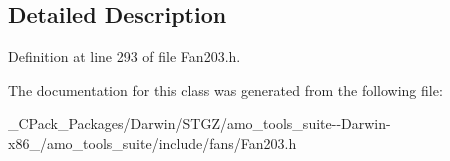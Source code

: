 \subsection{Detailed Description}


Definition at line 293 of file Fan203.\+h.



The documentation for this class was generated from the following file\+:\begin{DoxyCompactItemize}
\item 
\+\_\+\+C\+Pack\+\_\+\+Packages/\+Darwin/\+S\+T\+G\+Z/amo\+\_\+tools\+\_\+suite-\/-\/\+Darwin-\/x86\+\_/amo\+\_\+tools\+\_\+suite/include/fans/Fan203.\+h\end{DoxyCompactItemize}
